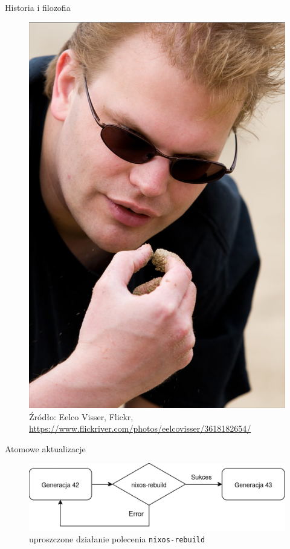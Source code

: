 \documentclass{beamer}
\begin{document}
\begin{frame}{Historia i filozofia}
    \begin{figure}
        \includegraphics[height=0.75\textheight]{./assets/eelco.jpg}
        \caption*{\scriptsize Źródło: Eelco Visser, Flickr, \url{https://www.flickriver.com/photos/eelcovisser/3618182654/}}
    \end{figure}
\end{frame}

\begin{frame}{Atomowe aktualizacje}
    \begin{figure}
        \includegraphics[width=\linewidth]{./assets/rebuild.drawio.png}
        \caption*{\scriptsize uproszczone działanie polecenia \texttt{nixos-rebuild}}
    \end{figure}
\end{frame}
\end{document}
